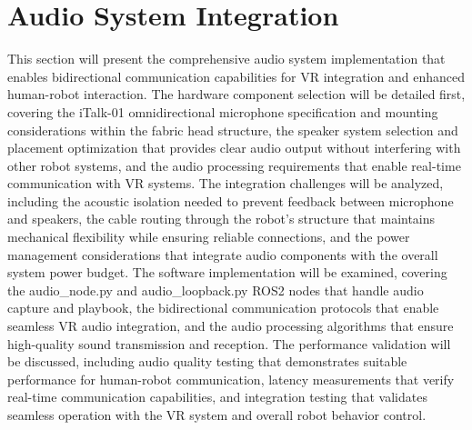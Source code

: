 \section{Audio System Integration}
This section will present the comprehensive audio system implementation that enables bidirectional communication capabilities for VR integration and enhanced human-robot interaction. The hardware component selection will be detailed first, covering the iTalk-01 omnidirectional microphone specification and mounting considerations within the fabric head structure, the speaker system selection and placement optimization that provides clear audio output without interfering with other robot systems, and the audio processing requirements that enable real-time communication with VR systems. The integration challenges will be analyzed, including the acoustic isolation needed to prevent feedback between microphone and speakers, the cable routing through the robot's structure that maintains mechanical flexibility while ensuring reliable connections, and the power management considerations that integrate audio components with the overall system power budget. The software implementation will be examined, covering the audio\_node.py and audio\_loopback.py ROS2 nodes that handle audio capture and playbook, the bidirectional communication protocols that enable seamless VR audio integration, and the audio processing algorithms that ensure high-quality sound transmission and reception. The performance validation will be discussed, including audio quality testing that demonstrates suitable performance for human-robot communication, latency measurements that verify real-time communication capabilities, and integration testing that validates seamless operation with the VR system and overall robot behavior control.

